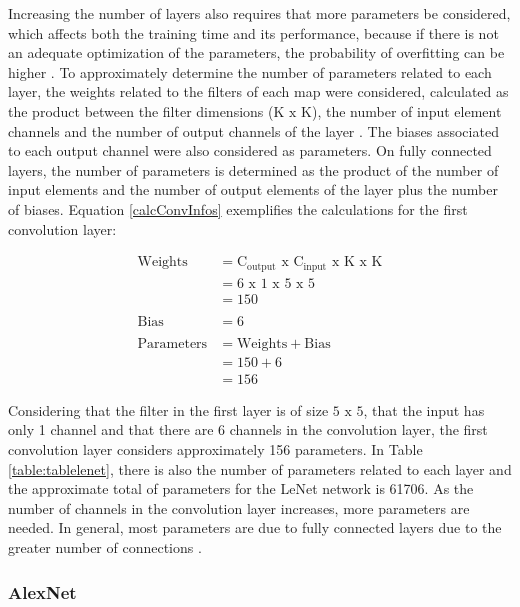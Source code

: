 Increasing the number of layers also requires that more parameters be considered, which affects both the training time and its performance, because if there is not an adequate optimization of the parameters, the probability of overfitting can be higher \cite{elgendy2020}. To approximately determine the number of parameters related to each layer, the weights related to the filters of each map were considered, calculated as the product between the filter dimensions ($\text{K x K}$), the number of input element channels and the number of output channels of the layer \cite{johnson2019}. The biases associated to each output channel were also considered as parameters. On fully connected layers, the number of parameters is determined as the product of the number of input elements and the number of output elements of the layer plus the number of biases. Equation \ref{calcConvInfos} exemplifies the calculations for the first convolution layer:

\begin{equation}
\begin{split}
  \text{Weights} &= \text{C}_\text{output} \text{ x } \text{C}_\text{input} \text{ x } \text{K} \text{ x } \text{K}\\ 
  &= 6\text{ x }1 \text{ x } 5 \text{ x } 5\\
  &= 150\\\\
  \text{Bias} &= 6\\\\
  \text{Parameters} &= \text{Weights} + \text{Bias}\\
  &= 150 + 6\\
  &= 156
\end{split}
\label{calcConvInfos}
\end{equation}

Considering that the filter in the first layer is of size $5\text{ x }5$, that the input has only 1 channel and that there are 6 channels in the convolution layer, the first convolution layer considers approximately 156 parameters. In Table \ref{table:tablelenet}, there is also the number of parameters related to each layer and the approximate total of parameters for the LeNet network is 61706. As the number of channels in the convolution layer increases, more parameters are needed. In general, most parameters are due to fully connected layers due to the greater number of connections \cite{johnson2019}.

\subsubsection{AlexNet}

